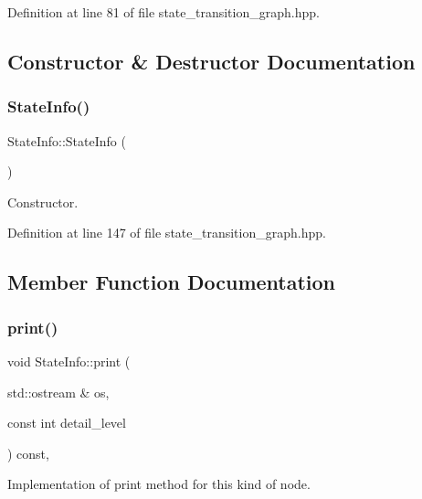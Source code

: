 Definition at line 81 of file state\+\_\+transition\+\_\+graph.\+hpp.



\subsection{Constructor \& Destructor Documentation}
\mbox{\label{structStateInfo_abacb72861ce64fb720801c42802a5068}} 
\subsubsection{\texorpdfstring{State\+Info()}{StateInfo()}}
{\footnotesize\ttfamily State\+Info\+::\+State\+Info (\begin{DoxyParamCaption}{ }\end{DoxyParamCaption})\hspace{0.3cm}{\ttfamily [inline]}}



Constructor. 



Definition at line 147 of file state\+\_\+transition\+\_\+graph.\+hpp.



\subsection{Member Function Documentation}
\mbox{\label{structStateInfo_af50fac3fb978c2de96361a42d8087962}} 
\subsubsection{\texorpdfstring{print()}{print()}}
{\footnotesize\ttfamily void State\+Info\+::print (\begin{DoxyParamCaption}\item[{std\+::ostream \&}]{os,  }\item[{const int}]{detail\+\_\+level }\end{DoxyParamCaption}) const\hspace{0.3cm}{\ttfamily [override]}, {\ttfamily [virtual]}}



Implementation of print method for this kind of node. 

